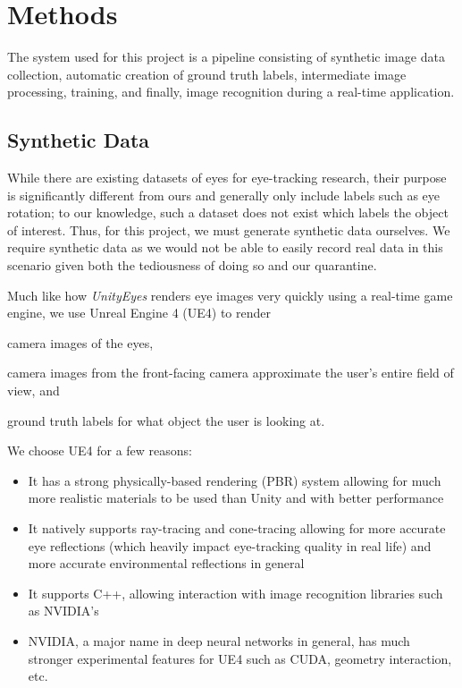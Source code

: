 \section{Methods}

The system used for this project is a pipeline consisting of synthetic image
data collection, automatic creation of ground truth labels, intermediate image
processing, training, and finally, image recognition during a real-time
application.

\subsection{Synthetic Data}

While there are existing datasets of eyes for eye-tracking research, their
purpose is significantly different from ours and generally only include labels
such as eye rotation; to our knowledge, such a dataset does not exist which
labels the object of interest. Thus, for this project, we must generate
synthetic data ourselves. We require synthetic data as we would not be able to
easily record real data in this scenario given both the tediousness of doing so
and our quarantine.

Much like how \emph{UnityEyes} renders eye images very quickly using a
real-time game engine, we use Unreal Engine 4 (UE4) to render
\begin{inlist}
\item camera images of the eyes,
\item camera images from the front-facing camera approximate the user's entire field of view, and
\item ground truth labels for what object the user is looking at.
\end{inlist}
We choose UE4 for a few reasons:

\begin{itemize}[leftmargin=*,noitemsep]
    \item
        It has a strong physically-based rendering (PBR) system allowing for
        much more realistic materials to be used than Unity and with better
        performance
    \item
        It natively supports ray-tracing and cone-tracing allowing for more
        accurate eye reflections (which heavily impact eye-tracking quality in
        real life) and more accurate environmental reflections in general
    \item
        It supports C++, allowing interaction with image recognition libraries
        such as NVIDIA's
    \item
        NVIDIA, a major name in deep neural networks in general, has much
        stronger experimental features for UE4 such as CUDA, geometry
        interaction, etc.
\end{itemize}

